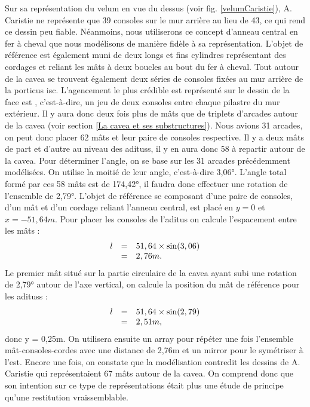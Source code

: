 Sur sa représentation du \gls{velum} en vue du dessus (voir fig. \ref{velumCaristie}), A. Caristie ne représente que 39 consoles sur le mur arrière au lieu de 43, ce qui rend ce dessin peu fiable. Néanmoins, nous utiliserons ce concept d'anneau central en fer à cheval que nous modélisons de manière fidèle à sa représentation. L'objet de référence est également muni de deux longs et fins cylindres représentant des cordages et reliant les mâts à deux boucles au bout du fer à cheval.
Tout autour de la \gls{cavea} se trouvent également deux séries de consoles fixées au mur arrière de la \gls{porticus isc}. L'agencement le plus crédible est représenté sur le dessin de la face est \cite[Pl. IV]{orangePl}, c'est-à-dire, un jeu de deux consoles entre chaque \gls{pilastre} du mur extérieur. Il y aura donc deux fois plus de mâts que de triplets d'arcades autour de la \gls{cavea} (voir section \ref{La cavea et ses substructures}). Nous avions 31 arcades, on peut donc placer 62 mâts et leur paire de consoles respective. Il y a deux mâts de part et d'autre au niveau des \glspl{aditus}, il y en aura donc 58 à repartir autour de la \gls{cavea}. Pour déterminer l'angle, on se base sur les 31 arcades précédemment modélisées. On utilise la moitié de leur angle, c'est-à-dire 3,06°. L'angle total formé par ces 58 mâts est de 174,42°, il faudra donc effectuer une rotation de l'ensemble de 2,79°. L'objet de référence se composant d'une paire de consoles, d'un mât et d'un cordage reliant l'anneau central, est placé en $y=0$ et $x=-51,64m$. Pour placer les consoles de l'\gls{aditus} on calcule l'espacement entre les mâts :
\begin{equation}
	\begin{array}{r c l}
	l &=&  51,64 \times \sin(3,06) \\ 
	 &=& 2,76m.
	 \end{array}
\end{equation}
Le premier mât situé sur la partie circulaire de la \gls{cavea} ayant subi une rotation de 2,79° autour de l'axe vertical, on calcule la position du mât de référence pour les \glspl{aditus} :
\begin{equation}
	\begin{array}{r c l}
		l & = & 51,64 \times \sin(2,79) \\
		 &= & 2,51m,
	\end{array}
\end{equation}
donc y = 0,25m. On utilisera ensuite un \gls{array} pour répéter une fois l'ensemble mât-consoles-cordes avec une distance de 2,76m et un \gls{mirror} pour le symétriser à l'est. Encore une fois, on constate que la modélisation contredit les dessins de A. Caristie qui représentaient 67 mâts autour de la \gls{cavea}. On comprend donc que son intention sur ce type de représentations était plus une étude de principe qu'une restitution vraissemblable.

